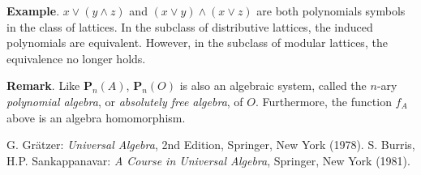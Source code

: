 \documentclass[12pt]{article}
\begin{document}
\textbf{Example}.  $x\vee(y\wedge z)$ and $(x\vee y)\wedge (x\vee z)$ are both polynomials symbols in the class of lattices.  In the subclass of distributive lattices, the induced polynomials are equivalent.  However, in the subclass of modular lattices, the equivalence no longer holds.

\textbf{Remark}.  Like $\textbf{P}_n(A)$, $\textbf{P}_n(O)$ is also an algebraic system, called the $n$-ary \emph{polynomial algebra}, or \emph{absolutely free algebra}, of $O$.  Furthermore, the function $f_A$ above is an algebra homomorphism.

\begin{thebibliography}{9}
 G. Gr\"{a}tzer: {\em Universal Algebra}, 2nd Edition, Springer, New York (1978).
 S. Burris, H.P. Sankappanavar: {\em A Course in Universal Algebra}, Springer, New York (1981).
\end{thebibliography}
\end{document}
